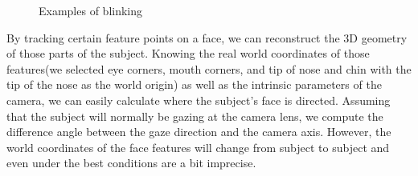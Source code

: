 \documentclass[11pt]{article}
\begin{document}
\begin{figure}%
    \centering
    \qquad
    \caption{Examples of blinking}%
    \label{gaze}%
\end{figure}

By tracking certain feature points on a face, we can reconstruct the 3D geometry of those parts of the subject. Knowing the real world coordinates of those features(we selected eye corners, mouth corners, and tip of nose and chin with the tip of the nose as the world origin) as well as the intrinsic parameters of the camera, we can easily calculate where the subject's face is directed. Assuming that the subject will normally be gazing at the camera lens, we compute the difference angle between the gaze direction and the camera axis. However, the world coordinates of the face features will change from subject to subject and even under the best conditions are a bit imprecise.
\end{document}
